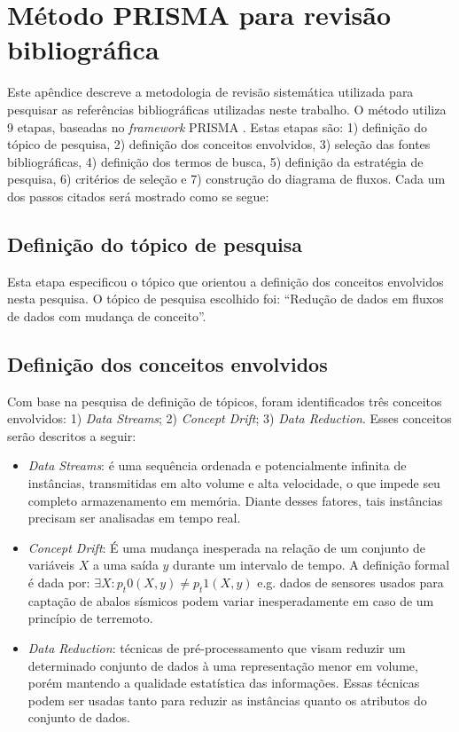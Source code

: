 \chapter{Método PRISMA para revisão bibliográfica}

Este apêndice descreve a metodologia de revisão sistemática utilizada para pesquisar as referências bibliográficas utilizadas neste trabalho. O método utiliza 9 etapas, baseadas no \textit{framework} PRISMA \cite{Moher2010}. Estas etapas são: 1) definição do tópico de pesquisa, 2) definição dos conceitos envolvidos, 3) seleção das fontes bibliográficas, 4) definição dos termos de busca, 5) definição da estratégia de pesquisa, 6) critérios de seleção e 7) construção do diagrama de fluxos. Cada um dos passos citados será mostrado como se segue:

\section{Definição do tópico de pesquisa}\label{sec:prisma_topico} 

Esta etapa especificou o tópico que orientou a definição dos conceitos envolvidos nesta pesquisa. O tópico de pesquisa escolhido foi: ``Redução de dados em fluxos de dados com mudança de conceito''.

\section{Definição dos conceitos envolvidos }\label{sec:prisma_conceitos} 

Com base na pesquisa de definição de tópicos, foram identificados três conceitos envolvidos: 1) \textit{Data Streams}; 2) \textit{Concept Drift}; 3) \textit{Data Reduction}. Esses conceitos serão descritos a seguir:

\begin{itemize}
\item \textit{Data Streams}: é uma sequência ordenada e potencialmente infinita de instâncias, transmitidas em alto volume e alta velocidade, o que impede seu completo armazenamento em memória. Diante desses fatores, tais instâncias precisam ser analisadas em tempo real.
\item \textit{Concept Drift}: É uma mudança inesperada na relação de um conjunto de variáveis $X$ a uma saída $y$ durante um intervalo de tempo. A definição formal é dada por: $ \exists X : p_t0 (X,y) \neq p_t1 (X,y) $ e.g. dados de sensores usados para captação de abalos sísmicos podem variar inesperadamente em caso de um princípio de terremoto.
\item \textit{Data Reduction}: técnicas de pré-processamento que visam reduzir um determinado conjunto de dados à uma representação menor em volume, porém mantendo a qualidade estatística das informações. Essas técnicas podem ser usadas tanto para reduzir as instâncias quanto os atributos do conjunto de dados.
\end{itemize}

